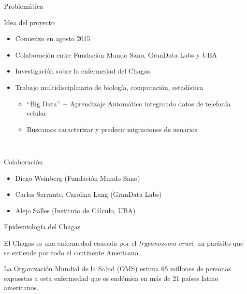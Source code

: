 \documentclass{beamer}
\begin{document}
\begin{frame}{Problemática}

	\begin{block}{Idea del proyecto}
		\begin{itemize}

			\item Comienzo en agosto 2015
			\item Colaboración entre Fundación Mundo Sano, GranData Labs y UBA
			\item Investigación sobre la enfermedad del Chagas.
			\item Trabajo multidisciplinario de biología, computación, estadística
			\begin{itemize}
				\item ``Big Data'' + Aprendizaje Automático integrando datos de telefonía celular
				\item  Buscamos caracterizar y predecir migraciones de usuarios
			\end{itemize}
		\end{itemize}
	\end{block}

	\pause\

	\begin{block}{ Colaboración}
		\begin{itemize}
			\item Diego Weinberg (Fundación Mundo Sano)
			\item Carlos Sarraute, Carolina Lang (GranData Labs)
			\item Alejo Salles (Instituto de Cálculo, UBA)
		\end{itemize}
	\end{block}

\end{frame}


\begin{frame}{ Epidemiología del Chagas}

			El Chagas es una enfermedad causada por el \textit{trypanozoma cruzi}, un parásito que se extiende por todo el continente Americano.

			\medskip  La Organización Mundial de la Salud (OMS) estima 65 millones de personas expuestas a esta enfermedad que es endémica en más de 21 países latino americanos.

\end{frame}
\end{document}
